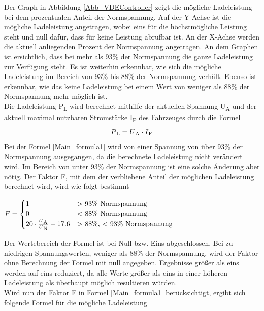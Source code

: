 Der Graph in Abbildung \ref{Abb_VDEController} zeigt die mögliche Ladeleistung bei dem prozentualen Anteil der Normspannung. Auf der Y-Achse ist die mögliche Ladeleistung angetragen, wobei eins für die höchstmögliche Leistung steht und null dafür, dass für keine Leistung abrufbar ist. An der X-Achse werden die aktuell anliegenden Prozent der Normspannung angetragen. An dem Graphen ist ersichtlich, dass bei mehr als 93\% der Normspannung die ganze Ladeleistung zur Verfügung steht. Es ist weiterhin erkennbar, wie sich die mögliche Ladeleistung im Bereich von 93\% bis 88\% der Normspannung verhält. Ebenso ist erkennbar, wie das keine Ladeleistung bei einem Wert von weniger als 88\% der Normspannung mehr möglich ist. \\
Die Ladeleistung P\textsubscript{L} wird berechnet mithilfe der aktuellen Spannung U\textsubscript{A} und der aktuell maximal nutzbaren Stromstärke I\textsubscript{F} des Fahrzeuges durch die Formel
\begin{align}
	P\textsubscript{L} = U\textsubscript{A} \cdot I\textsubscript{F} \label{Main_formula1}
\end{align}
Bei der Formel \ref{Main_formula1} wird von einer Spannung von über 93\% der Normspannung ausgegangen, da die berechnete Ladeleistung nicht verändert wird. Im Bereich von unter 93\% der Normspannung ist eine solche Änderung aber nötig. Der Faktor F, mit dem der verbliebene Anteil der möglichen Ladeleistung berechnet wird, wird wie folgt bestimmt \\
\begin{center}
	$ F = \begin{cases}
	1 &  \text{$>$ 93\% Normspannung} \\
	0 &  \text{$<$ 88\% Normspannung} \\
	20 \cdot \frac{U\textsubscript{A}}{U\textsubscript{N}} - 17.6 & \text{$>$ 88\%, $<$ 93\% Normspannung}
	\end{cases}
	$
\end{center}
Der Wertebereich der Formel ist bei Null bzw. Eins abgeschlossen. Bei zu niedrigen Spannungswerten, weniger als 88\% der Normspannung, wird der Faktor ohne Berechnung der Formel mit null angegeben. Ergebnisse größer als eins werden auf eins reduziert, da alle Werte größer als eins in einer höheren Ladeleistung als überhaupt möglich resultieren würden. \\
Wird nun der Faktor F in Formel \ref{Main_formula1} berücksichtigt, ergibt sich folgende Formel für die mögliche Ladeleistung\\

